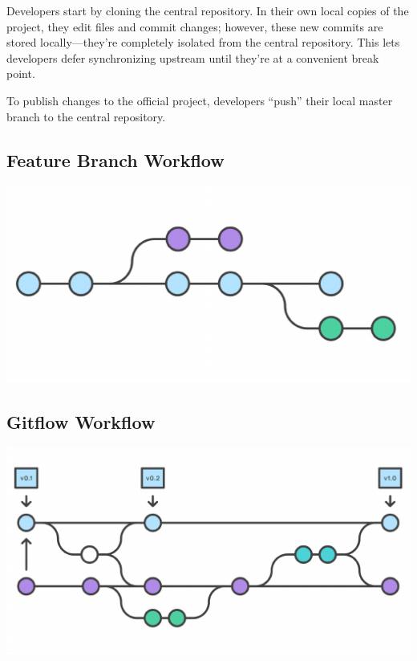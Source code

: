 \documentclass{article}
\begin{document}
Developers start by cloning the central repository. In their own local
copies of the project, they edit files and commit changes; however,
these new commits are stored locally—they're 
completely isolated from the central repository. This lets developers
defer synchronizing upstream until they’re at a convenient break
point.

To publish changes to the official project, developers “push” their
local master branch to the central repository. 


\subsection{Feature Branch Workflow}

\begin{center}
\includegraphics[scale=0.5]{figures/13.pdf}
\end{center}


\subsection{Gitflow Workflow}

\begin{center}
\includegraphics[scale=0.5]{figures/14.pdf}
\end{center}
\end{document}

